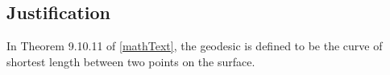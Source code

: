 \documentclass[conference]{acmsiggraph}
\begin{document}
\subsection{Justification}

In Theorem 9.10.11 of \ref{mathText}, the geodesic is defined to be the curve of shortest length between two points on the surface. 




\end{document}
